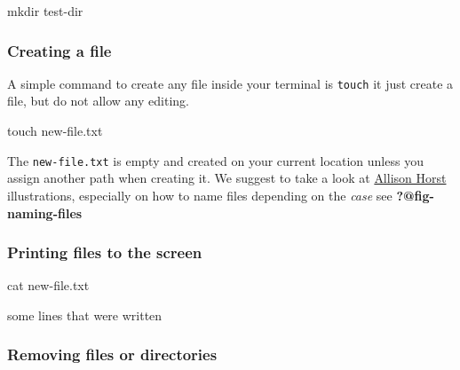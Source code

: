 \documentclass[
  letterpaper,
  DIV=11,
  numbers=noendperiod,
  oneside]{scrreprt}
\newenvironment{Shaded}{\begin{snugshade}}{\end{snugshade}}
\newcommand{\ExtensionTok}[1]{\textcolor[rgb]{0.00,0.23,0.31}{#1}}
\newcommand{\FunctionTok}[1]{\textcolor[rgb]{0.28,0.35,0.67}{#1}}
\newcommand{\NormalTok}[1]{\textcolor[rgb]{0.00,0.23,0.31}{#1}}
\begin{document}
\begin{Shaded}
\begin{Highlighting}[]
\FunctionTok{mkdir}\NormalTok{ test{-}dir}
\end{Highlighting}
\end{Shaded}

\hypertarget{creating-a-file}{%
\subsubsection{Creating a file}\label{creating-a-file}}

A simple command to create any file inside your terminal is
\texttt{touch} it just create a file, but do not allow any editing.

\begin{Shaded}
\begin{Highlighting}[]
\FunctionTok{touch}\NormalTok{ new{-}file.txt}
\end{Highlighting}
\end{Shaded}

The \texttt{new-file.txt} is empty and created on your current location
unless you assign another path when creating it. We suggest to take a
look at \href{https://github.com/allisonhorst/}{Allison Horst}
illustrations, especially on how to name files depending on the
\emph{case} see \textbf{?@fig-naming-files}

\hypertarget{printing-files-to-the-screen}{%
\subsubsection{Printing files to the
screen}\label{printing-files-to-the-screen}}

\begin{Shaded}
\begin{Highlighting}[]
\FunctionTok{cat}\NormalTok{ new{-}file.txt}
\end{Highlighting}
\end{Shaded}

\begin{Shaded}
\begin{Highlighting}[]
\ExtensionTok{some}
\ExtensionTok{lines}
\ExtensionTok{that}
\ExtensionTok{were}
\ExtensionTok{written}
\end{Highlighting}
\end{Shaded}

\hypertarget{removing-files-or-directories}{%
\subsubsection{Removing files or
directories}\label{removing-files-or-directories}}
\end{document}
